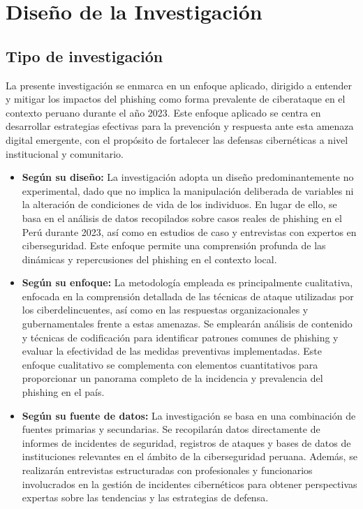 \chapter{Diseño de la Investigación}

\section{Tipo de investigación}
La presente investigación se enmarca en un enfoque aplicado, dirigido a entender y mitigar los impactos del phishing como forma prevalente de ciberataque en el contexto peruano durante el año 2023. Este enfoque aplicado se centra en desarrollar estrategias efectivas para la prevención y respuesta ante esta amenaza digital emergente, con el propósito de fortalecer las defensas cibernéticas a nivel institucional y comunitario.
\begin{itemize}
    \item \textbf{Según su diseño:}
    La investigación adopta un diseño predominantemente no experimental, dado que no implica la manipulación deliberada de variables ni la alteración de condiciones de vida de los individuos. En lugar de ello, se basa en el análisis de datos recopilados sobre casos reales de phishing en el Perú durante 2023, así como en estudios de caso y entrevistas con expertos en ciberseguridad. Este enfoque permite una comprensión profunda de las dinámicas y repercusiones del phishing en el contexto local.
    \item \textbf{Según su enfoque:}
    La metodología empleada es principalmente cualitativa, enfocada en la comprensión detallada de las técnicas de ataque utilizadas por los ciberdelincuentes, así como en las respuestas organizacionales y gubernamentales frente a estas amenazas. Se emplearán análisis de contenido y técnicas de codificación para identificar patrones comunes de phishing y evaluar la efectividad de las medidas preventivas implementadas. Este enfoque cualitativo se complementa con elementos cuantitativos para proporcionar un panorama completo de la incidencia y prevalencia del phishing en el país.
    \item \textbf{Según su fuente de datos:}
    La investigación se basa en una combinación de fuentes primarias y secundarias. Se recopilarán datos directamente de informes de incidentes de seguridad, registros de ataques y bases de datos de instituciones relevantes en el ámbito de la ciberseguridad peruana. Además, se realizarán entrevistas estructuradas con profesionales y funcionarios involucrados en la gestión de incidentes cibernéticos para obtener perspectivas expertas sobre las tendencias y las estrategias de defensa.

\end{itemize}
